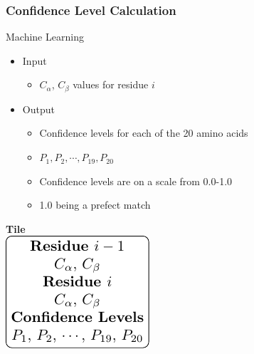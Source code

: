\documentclass{beamer}
\begin{document}
\begin{frame}
	\frametitle{Confidence Level Calculation}
	\begin{minipage}{0.45\textwidth}
		\begin{block}{Machine Learning}
			\begin{itemize}
				\item Input
				\begin{itemize}
					\item $C_{\alpha}$, $C_{\beta}$ values for residue $i$
				\end{itemize}
				\item Output
				\begin{itemize}
					\item Confidence levels for each of the 20 amino acids
					\item $P_1, P_2, \cdots, P_{19},P_{20}$
					\item Confidence levels are on a scale from 0.0-1.0
					\item 1.0 being a prefect match
				\end{itemize}
			\end{itemize}
		\end{block}
	\end{minipage}
	\begin{minipage}{0.15\textwidth}

	
	\end{minipage}
	\begin{minipage}{0.45\textwidth}
	\begin{center}
		\huge\textbf{Tile}\\
		\vspace {12pt}
		\includegraphics[width=\textwidth]{tile_fig}
	\end{center}
	\end{minipage}
\end{frame}
\end{document}

